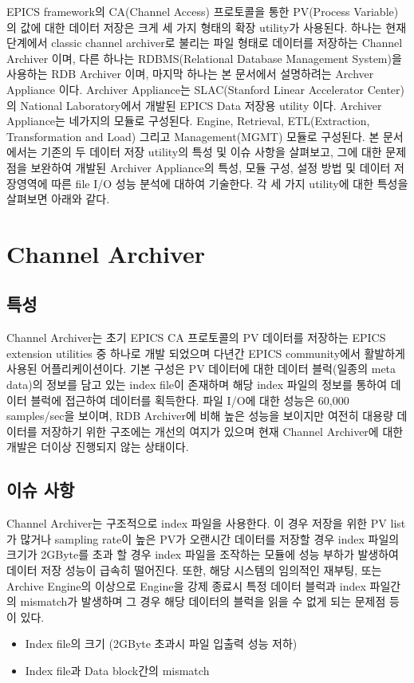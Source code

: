 \documentclass[11pt
  , a4paper
  , article
  , oneside
]{memoir}
\begin{document}
EPICS framework\cite{epics}의 CA(Channel Access) 프로토콜을 통한 PV(Process Variable)의 값에 대한 데이터 저장은 크게 세 가지 형태의 확장 utility가 사용된다. 하나는 현재 단계에서 classic channel archiver로 불리는 파일 형태로 데이터를 저장하는 Channel Archiver\cite{archiver} 이며, 다른 하나는 RDBMS(Relational Database Management System)을 사용하는 RDB Archiver\cite{rdbarchiver} 이며, 마지막 하나는 본 문서에서 설명하려는 Archver Appliance 이다. Archiver Appliance\cite{appliance}는 SLAC(Stanford Linear Accelerator Center)의 National Laboratory에서 개발된 EPICS Data 저장용 utility 이다. Archiver Appliance\cite{appliance}는 네가지의 모듈로 구성된다. Engine, Retrieval, ETL(Extraction, Transformation and Load) 그리고 Management(MGMT) 모듈로 구성된다. 본 문서에서는 기존의 두 데이터 저장 utility의 특성 및 이슈 사항을 살펴보고, 그에 대한 문제점을 보완하여 개발된 Archiver Appliance의 특성, 모듈 구성, 설정 방법 및 데이터 저장영역에 따른 file I/O 성능 분석에 대하여 기술한다. 각 세 가지 utility에 대한 특성을 살펴보면 아래와 같다.


\hfil\break
\chapter{Channel Archiver}
\section{특성}
Channel Archiver\cite{archiver}는 초기 EPICS CA 프로토콜의 PV 데이터를 저장하는 EPICS extension utilities 중 하나로 개발 되었으며 다년간 EPICS community에서 활발하게 사용된 어플리케이션이다. 기본 구성은 PV 데이터에 대한 데이터 블럭(일종의 meta data)의 정보를 담고 있는 index file이 존재하며 해당 index 파일의 정보를 통하여 데이터 블럭에 접근하여 데이터를 획득한다. 파일 I/O에 대한 성능은 60,000 samples/sec을 보이며, RDB Archiver에 비해 높은 성능을 보이지만 여전히 대용량 데이터를 저장하기 위한 구조에는 개선의 여지가 있으며 현재 Channel Archiver에 대한 개발은 더이상 진행되지 않는 상태이다.
\section{이슈 사항}
Channel Archiver\cite{archiver}는 구조적으로 index 파일을 사용한다. 이 경우 저장을 위한 PV list가 많거나 sampling rate이 높은 PV가 오랜시간 데이터를 저장할 경우 index 파일의 크기가 2GByte를 초과 할 경우 index 파일을 조작하는 모듈에 성능 부하가 발생하여 데이터 저장 성능이 급속히 떨어진다. 또한, 해당 시스템의 임의적인 재부팅, 또는 Archive Engine의 이상으로 Engine을 강제 종료시 특정 데이터 블럭과 index 파일간의 mismatch가 발생하며 그 경우 해당 데이터의 블럭을 읽을 수 없게 되는 문제점 등이 있다.
\begin{itemize}
	\item Index file의 크기 (2GByte 초과시 파일 입출력 성능 저하)
	\item Index file과 Data block간의 mismatch
\end{itemize}
\hfil\break
\end{document}
